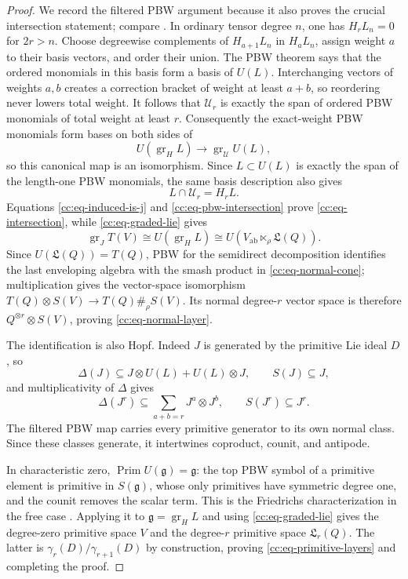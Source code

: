 \documentclass[10pt,reqno]{amsart}
\theoremstyle{plain}
\theoremstyle{definition}
\theoremstyle{remark}
\begin{document}
\begin{proof}
We record the filtered PBW argument because it also proves the crucial
intersection statement; compare \cite{Quillen68}.  In ordinary
tensor degree \(n\), one has
\(H_rL_n=0\) for \(2r>n\).  Choose degreewise complements of
\(H_{a+1}L_n\) in \(H_aL_n\), assign weight \(a\) to their basis
vectors, and order their union.  The PBW theorem
\cite[\S0.1]{Reutenauer93} says that the ordered monomials in this basis
form a basis of \(U(L)\).  Interchanging vectors of weights \(a,b\)
creates a correction bracket of weight at least \(a+b\), so reordering
never lowers total weight.  It follows that \(\mathcal U_r\) is exactly
the span of ordered PBW monomials of total weight at least \(r\).
Consequently the exact-weight PBW
monomials form bases on both sides of
\[
 U({\operatorname{gr}}_HL)\longrightarrow{\operatorname{gr}}_{\mathcal U}U(L),
\]
so this canonical map is an isomorphism.  Since \(L\subset U(L)\) is
exactly the span of the length-one PBW monomials, the same basis
description also gives
\begin{equation}
 L\cap\mathcal U_r=H_rL.
 \label{cc:eq-pbw-intersection}
\end{equation}
Equations \eqref{cc:eq-induced-is-j} and
\eqref{cc:eq-pbw-intersection} prove
\eqref{cc:eq-intersection}, while
\eqref{cc:eq-graded-lie} gives
\[
 {\operatorname{gr}}_JT(V)\cong U({\operatorname{gr}}_HL)
 \cong U\!\left(V_{\mathrm{ab}}\ltimes_\rho{\mathfrak L}(Q)\right).
\]
Since \(U({\mathfrak L}(Q))=T(Q)\), PBW for the semidirect decomposition identifies
the last enveloping algebra with the smash product in
\eqref{cc:eq-normal-cone}; multiplication gives the vector-space
isomorphism \(T(Q)\otimes S(V)\to T(Q)\#_\rho S(V)\).  Its normal
degree-\(r\) vector space is therefore
\(Q^{\otimes r}\otimes S(V)\), proving
\eqref{cc:eq-normal-layer}.

The identification is also Hopf.  Indeed \(J\) is generated by the
primitive Lie ideal \(D\), so
\[
 \Delta(J)\subseteq J\otimes U(L)+U(L)\otimes J,
 \qquad S(J)\subseteq J,
\]
and multiplicativity of \(\Delta\) gives
\begin{equation}
 \Delta(J^r)\subseteq\sum_{a+b=r}J^a\otimes J^b,
 \qquad S(J^r)\subseteq J^r.
 \label{cc:eq-hopf-filtration}
\end{equation}
The filtered PBW map carries every primitive generator to its own normal
class.  Since these classes generate, it intertwines coproduct, counit,
and antipode.

In characteristic zero, \({\operatorname{Prim}} U(\mathfrak g)=\mathfrak g\): the top
PBW symbol of a primitive element is primitive in \(S(\mathfrak g)\),
whose only primitives have symmetric degree one, and the counit removes
the scalar term.  This is the Friedrichs characterization in the free
case \cite[Thm.~1.4]{Reutenauer93}.  Applying it to
\(\mathfrak g={\operatorname{gr}}_HL\) and using \eqref{cc:eq-graded-lie} gives the
degree-zero primitive space \(V\) and the degree-\(r\) primitive space
\({\mathfrak L}_r(Q)\).  The latter is
\(\gamma_r(D)/\gamma_{r+1}(D)\) by construction, proving
\eqref{cc:eq-primitive-layers} and completing the proof.
\end{proof}
\end{document}
